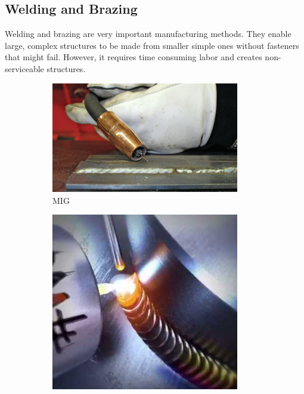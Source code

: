  	\subsection{Welding and Brazing}
 	Welding and brazing are very important manufacturing methods. They enable large, complex structures to be made from smaller simple ones without fasteners that might fail. However, it requires time consuming labor and creates non-serviceable structures.
 	
 	\begin{figure}[H]
		\centering
		\begin{subfigure}[b]{.24\linewidth}
			\includegraphics[width=0.9\textwidth]{imgs/mig.png}
			\caption{MIG}
		\end{subfigure}\begin{subfigure}[b]{.24\linewidth}
			\includegraphics[width=0.9\textwidth]{imgs/tig.png}

\end{subfigure}
\end{figure}
